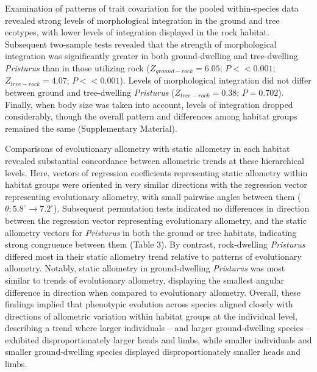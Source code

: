 \documentclass[
  11pt,
]{article}
\begin{document}
Examination of patterns of trait covariation for the pooled
within-species data revealed strong levels of morphological integration
in the ground and tree ecotypes, with lower levels of integration
displayed in the rock habitat. Subsequent two-sample tests revealed that
the strength of morphological integration was significantly greater in
both ground-dwelling and tree-dwelling \emph{Pristurus} than in those
utilizing rock (\(Z_{ground-rock}=6.05\); \(P << 0.001\);
\(Z_{tree-rock}=4.07\); \(P << 0.001\)). Levels of morphological
integration did not differ between ground and tree-dwelling
\emph{Pristurus} (\(Z_{tree-rock}=0.38\); \(P = 0.702\)). Finally, when
body size was taken into account, levels of integration dropped
considerably, though the overall pattern and differences among habitat
groups remained the same (Supplementary Material). \hfill\break

Comparisons of evolutionary allometry with static allometry in each
habitat revealed substantial concordance between allometric trends at
these hierarchical levels. Here, vectors of regression coefficients
representing static allometry within habitat groups were oriented in
very similar directions with the regression vector representing
evolutionary allometry, with small pairwise angles between them
(\(\theta: 5.8^\circ\rightarrow7.2^\circ\)). Subsequent permutation
tests indicated no differences in direction between the regression
vector representing evolutionary allometry, and the static allometry
vectors for \emph{Pristurus} in both the ground or tree habitats,
indicating strong congruence between them (Table 3). By contrast,
rock-dwelling \emph{Pristurus} differed most in their static allometry
trend relative to patterns of evolutionary allometry. Notably, static
allometry in ground-dwelling \emph{Pristurus} was most similar to trends
of evolutionary allometry, displaying the smallest angular difference in
direction when compared to evolutionary allometry. Overall, these
findings implied that phenotypic evolution across species aligned
closely with directions of allometric variation within habitat groups at
the individual level, describing a trend where larger individuals -- and
larger ground-dwelling species -- exhibited disproportionately larger
heads and limbs, while smaller individuals and smaller ground-dwelling
species displayed disproportionately smaller heads and limbs.
\hfill\break
\end{document}
